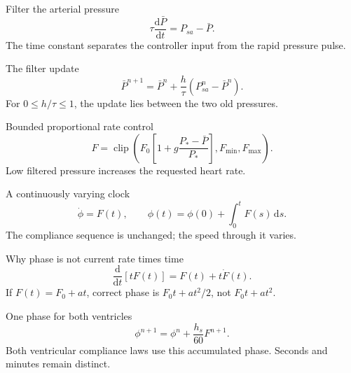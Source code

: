 \documentclass[aspectratio=169,11pt]{beamer}
\newcommand{\notestarget}{notes.pdf}\newcommand{\noteslabel}{Notes}
\begin{document}
\renewcommand{\notestarget}{notes.pdf\#note-filtered-pressure-and-bounded-proportional-control}
\begin{frame}[t,fragile,label=slide-filter-the-arterial-pressure]{Filter the arterial pressure}
\[\tau\frac{\mathrm d\bar P}{\mathrm dt}=P_{sa}-\bar P.\]\pause{} The time constant separates the controller input from the rapid pressure pulse.
\end{frame}
\renewcommand{\notestarget}{notes.pdf\#note-filtered-pressure-and-bounded-proportional-control}
\begin{frame}[t,fragile,label=slide-the-filter-update]{The filter update}
\[\bar P^{n+1}=\bar P^n+\frac h\tau(P_{sa}^n-\bar P^n).\]\pause{} For $0\le h/\tau\le1$, the update lies between the two old pressures.
\end{frame}
\renewcommand{\notestarget}{notes.pdf\#note-filtered-pressure-and-bounded-proportional-control}
\begin{frame}[t,fragile,label=slide-bounded-proportional-rate-control]{Bounded proportional rate control}
\[F=\operatorname{clip}\!\left(F_0\left[1+g\frac{P_* -\bar P}{P_*}\right],F_{\min},F_{\max}\right).\]\pause{} Low filtered pressure increases the requested heart rate.
\end{frame}
\renewcommand{\notestarget}{notes.pdf\#note-the-accumulated-cardiac-clock}
\begin{frame}[t,fragile,label=slide-a-continuously-varying-clock]{A continuously varying clock}
\[\dot\phi=F(t),\qquad \phi(t)=\phi(0)+\int_0^tF(s)\,\mathrm ds.\]\pause{} The compliance sequence is unchanged; the speed through it varies.
\end{frame}
\renewcommand{\notestarget}{notes.pdf\#note-the-accumulated-cardiac-clock}
\begin{frame}[t,fragile,label=slide-why-phase-is-not-current-rate-times-time]{Why phase is not current rate times time}
\[\frac{\mathrm d}{\mathrm dt}[tF(t)]=F(t)+t\dot F(t).\]\pause{} If $F(t)=F_0+at$, correct phase is $F_0t+at^2/2$, not $F_0t+at^2$.
\end{frame}
\renewcommand{\notestarget}{notes.pdf\#note-the-accumulated-cardiac-clock}
\begin{frame}[t,fragile,label=slide-one-phase-for-both-ventricles]{One phase for both ventricles}
\[\phi^{n+1}=\phi^n+\frac{h_s}{60}F^{n+1}.\]\pause{} Both ventricular compliance laws use this accumulated phase. Seconds and minutes remain distinct.
\end{frame}
\renewcommand{\notestarget}{notes.pdf\#note-a-prescribed-resistance-disturbance}
\end{document}
